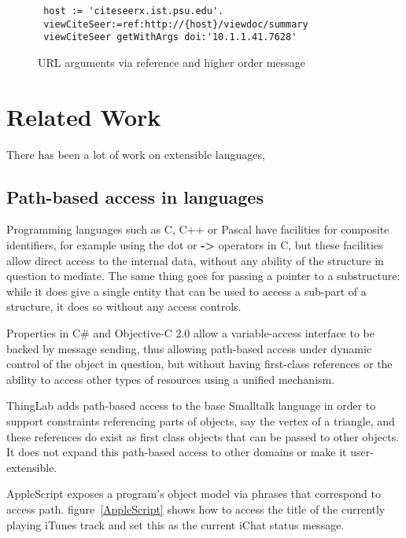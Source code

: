\documentclass[preprint,authoryear]{acm_proc_article-sp}
\begin{document}
\begin{figure}[htbp]
\begin{center}
\begin{small}
\begin{verbatim}
 host := 'citeseerx.ist.psu.edu'.
 viewCiteSeer:=ref:http://{host}/viewdoc/summary
 viewCiteSeer getWithArgs doi:'10.1.1.41.7628'
\end{verbatim}
\end{small}
\caption{URL arguments via reference and higher order message}
\label{url-args}
\end{center}
\end{figure}




\section{Related Work}

There has been a lot of work on extensible languages, 

\subsection{Path-based access in languages}

Programming languages such as C, C++ or Pascal have facilities for composite
identifiers, for example using the dot or {\bf -> } operators in C, but these facilities allow
direct access to the internal data, without any ability of the structure in question to 
mediate.  The same thing goes for passing a pointer to a substructure:  while it
does give a single entity that can be used to access a sub-part of a structure, it
does so without any access controls.

Properties in C\# and Objective-C 2.0 allow a variable-access interface to be backed by 
message sending, thus allowing path-based access under dynamic control of the object
in question, but without having first-class references or the ability to access other
types of resources using a unified mechanism.

ThingLab\cite{thinglab}  adds path-based access to the base Smalltalk language in order to support
constraints referencing parts of objects, say the vertex of a triangle, and these
references do exist as first class objects that can be passed to other objects.
   It does not
expand this path-based access to other domains or make it user-extensible.

AppleScript\cite{applescript-hopl3} exposes a program's object model via
phrases that correspond to access path.  figure~\ref{AppleScript} shows 
how to access the title of the currently playing iTunes track and set this
as the current iChat status message.
\end{document}
